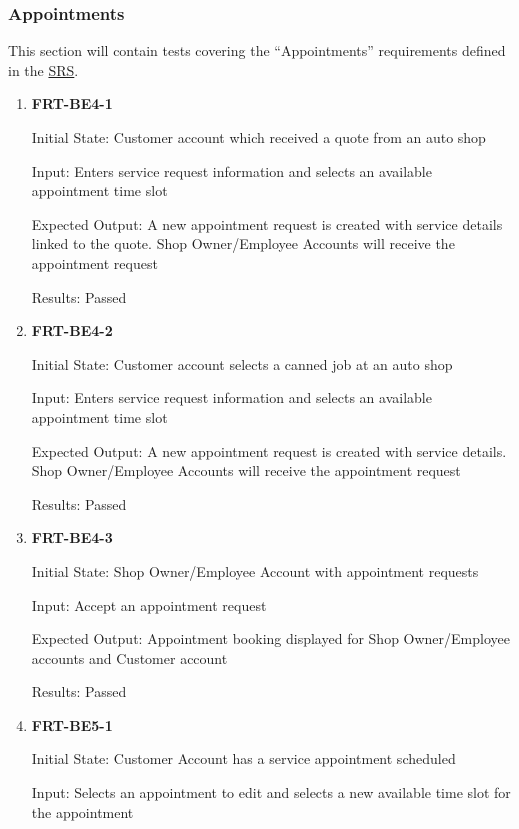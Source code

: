 \documentclass[12pt, titlepage]{article}
\begin{document}
\subsubsection{Appointments}

This section will contain tests covering the ``Appointments'' requirements defined in the
\href{https://github.com/arkinmodi/project-sayyara/blob/main/docs/SRS/SRS.pdf}{SRS}.

\begin{enumerate}

	\item \textbf{FRT-BE4-1}

	      Initial State: Customer account which received a quote from an auto shop

	      Input: Enters service request information and selects an available appointment time slot

	      Expected Output: A new appointment request is created with service details linked to the quote.
	      Shop Owner/Employee Accounts will receive the appointment request

	      Results: Passed

	\item \textbf{FRT-BE4-2}

	      Initial State: Customer account selects a canned job at an auto shop

	      Input: Enters service request information and selects an available appointment time slot

	      Expected Output: A new appointment request is created with service details. Shop Owner/Employee
	      Accounts will receive the appointment request

	      Results: Passed

	\item \textbf{FRT-BE4-3}

	      Initial State: Shop Owner/Employee Account with appointment requests

	      Input: Accept an appointment request

	      Expected Output: Appointment booking displayed for Shop Owner/Employee accounts and Customer
	      account

	      Results: Passed

	\item \textbf{FRT-BE5-1}

	      Initial State: Customer Account has a service appointment scheduled

	      Input: Selects an appointment to edit and selects a new available time slot for the appointment


\end{enumerate}
\end{document}
